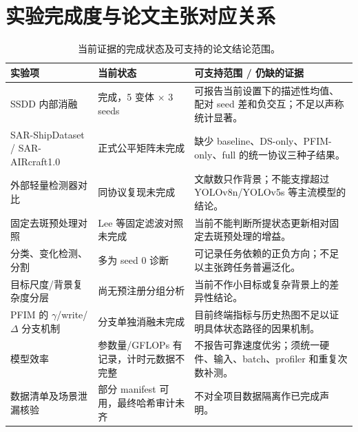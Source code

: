\documentclass[UTF8,12pt,a4paper]{ctexart}
\begin{document}
\section{实验完成度与论文主张对应关系}
\begin{table}[H]\centering\scriptsize
\caption{当前证据的完成状态及可支持的论文结论范围。}
\begin{tabularx}{\linewidth}{p{3.3cm}p{2.3cm}X}
\toprule
实验项 & 当前状态 & 可支持范围 / 仍缺的证据\\
\midrule
SSDD 内部消融 & 完成，5 变体 $\times$ 3 seeds & 可报告当前设置下的描述性均值、配对 seed 差和负交互；不足以声称统计显著。\\
SAR-ShipDataset / SAR-AIRcraft1.0 & 正式公平矩阵未完成 & 缺少 baseline、DS-only、PFIM-only、full 的统一协议三种子结果。\\
外部轻量检测器对比 & 同协议复现未完成 & 文献数只作背景；不能支撑超过 YOLOv8n/YOLOv5s 等主流模型的结论。\\
固定去斑预处理对照 & Lee 等固定滤波对照未完成 & 当前不能判断所提状态更新相对固定去斑预处理的增益。\\
分类、变化检测、分割 & 多为 seed 0 诊断 & 可记录任务依赖的正负方向；不足以主张跨任务普遍泛化。\\
目标尺度/背景复杂度分层 & 尚无预注册分组分析 & 当前不作小目标或复杂背景上的差异性结论。\\
PFIM 的 $\gamma$/write/$\Delta$ 分支机制 & 分支单独消融未完成 & 目前终端指标与历史热图不足以证明具体状态路径的因果机制。\\
模型效率 & 参数量/GFLOPs 有记录，计时元数据不完整 & 不报告可靠速度优劣；须统一硬件、输入、batch、profiler 和重复次数补测。\\
数据清单及场景泄漏核验 & 部分 manifest 可用，最终哈希审计未齐 & 不对全项目数据隔离作已完成声明。\\
\bottomrule
\end{tabularx}
\end{table}
\end{document}
